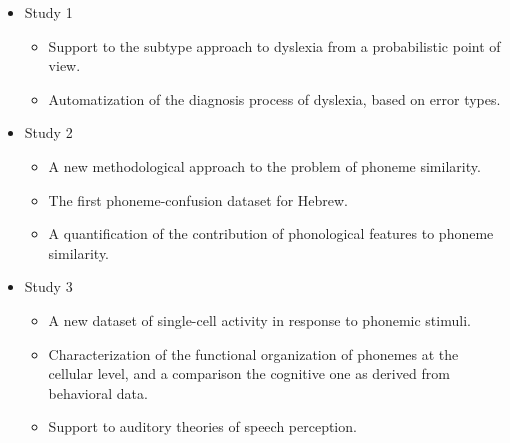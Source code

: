 \begin{itemize}
   \item  Study 1
   \begin{itemize}
        \item  Support to the subtype approach to dyslexia from a probabilistic point of view.
        \item Automatization of the diagnosis process of dyslexia, based on error types.
    \end{itemize}
   
    \item  Study 2
    \begin{itemize}
        \item A new methodological approach to the problem of phoneme similarity.
        \item The first phoneme-confusion dataset for Hebrew.
        \item A quantification of the contribution of phonological features to phoneme similarity.
   \end{itemize}
   
   \item Study 3
   \begin{itemize}
        \item A new dataset of single-cell activity in response to phonemic stimuli.
        \item Characterization of the functional organization of phonemes at the cellular level, and a comparison the cognitive one as derived from behavioral data.
        \item Support to auditory theories of speech perception.
   \end{itemize}
\end{itemize}